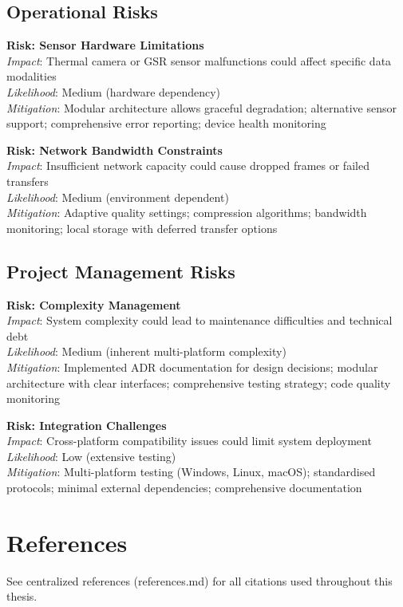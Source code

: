 \subsection{Operational Risks}
\textbf{Risk: Sensor Hardware Limitations}\\
\emph{Impact}: Thermal camera or GSR sensor malfunctions could affect specific data modalities\\
\emph{Likelihood}: Medium (hardware dependency)\\
\emph{Mitigation}: Modular architecture allows graceful degradation; alternative sensor support; comprehensive error reporting; device health monitoring

\textbf{Risk: Network Bandwidth Constraints}\\
\emph{Impact}: Insufficient network capacity could cause dropped frames or failed transfers\\
\emph{Likelihood}: Medium (environment dependent)\\
\emph{Mitigation}: Adaptive quality settings; compression algorithms; bandwidth monitoring; local storage with deferred transfer options

\subsection{Project Management Risks}
\textbf{Risk: Complexity Management}\\
\emph{Impact}: System complexity could lead to maintenance difficulties and technical debt\\
\emph{Likelihood}: Medium (inherent multi-platform complexity)\\
\emph{Mitigation}: Implemented ADR documentation for design decisions; modular architecture with clear interfaces; comprehensive testing strategy; code quality monitoring

\textbf{Risk: Integration Challenges}\\
\emph{Impact}: Cross-platform compatibility issues could limit system deployment\\
\emph{Likelihood}: Low (extensive testing)\\
\emph{Mitigation}: Multi-platform testing (Windows, Linux, macOS); standardised protocols; minimal external dependencies; comprehensive documentation

\section*{References}
See centralized references (references.md) for all citations used throughout this thesis.
